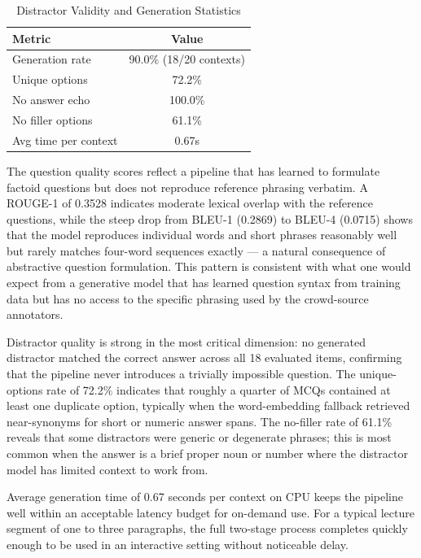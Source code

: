 \begin{table}[h!]
\centering
\caption{Distractor Validity and Generation Statistics}
\label{tab:mcq_distractor}
\begin{tabular}{|l|c|}
\hline
\textbf{Metric} & \textbf{Value} \\
\hline
Generation rate       & 90.0\% (18/20 contexts) \\
\hline
Unique options        & 72.2\% \\
\hline
No answer echo        & 100.0\% \\
\hline
No filler options     & 61.1\% \\
\hline
Avg time per context  & 0.67s \\
\hline
\end{tabular}
\end{table}

The question quality scores reflect a pipeline that has learned to formulate factoid questions but does not reproduce reference phrasing verbatim. A ROUGE-1 of 0.3528 indicates moderate lexical overlap with the reference questions, while the steep drop from BLEU-1 (0.2869) to BLEU-4 (0.0715) shows that the model reproduces individual words and short phrases reasonably well but rarely matches four-word sequences exactly — a natural consequence of abstractive question formulation. This pattern is consistent with what one would expect from a generative model that has learned question syntax from training data but has no access to the specific phrasing used by the crowd-source annotators.

Distractor quality is strong in the most critical dimension: no generated distractor matched the correct answer across all 18 evaluated items, confirming that the pipeline never introduces a trivially impossible question. The unique-options rate of 72.2\% indicates that roughly a quarter of MCQs contained at least one duplicate option, typically when the word-embedding fallback retrieved near-synonyms for short or numeric answer spans. The no-filler rate of 61.1\% reveals that some distractors were generic or degenerate phrases; this is most common when the answer is a brief proper noun or number where the distractor model has limited context to work from.

Average generation time of 0.67 seconds per context on CPU keeps the pipeline well within an acceptable latency budget for on-demand use. For a typical lecture segment of one to three paragraphs, the full two-stage process completes quickly enough to be used in an interactive setting without noticeable delay.
